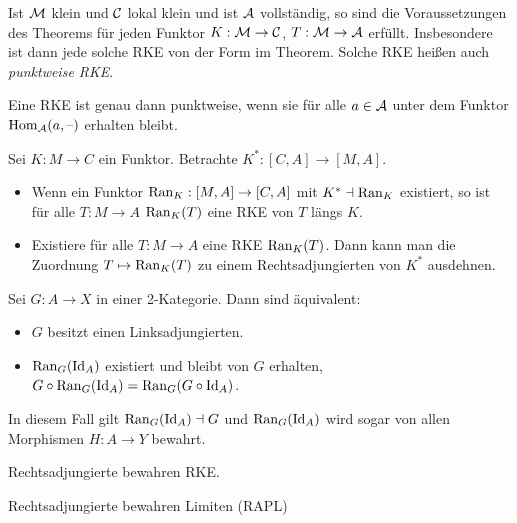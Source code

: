 \documentclass{cheat-sheet}
\begin{document}
\begin{bem}
  Ist $\mathcal{M}$ klein und $\mathcal{C}$ lokal klein und ist $\mathcal{A}$ vollständig, so sind die Voraussetzungen des Theorems für jeden Funktor $K : \mathcal{M} \to \mathcal{C}$, $T : \mathcal{M} \to \mathcal{A}$ erfüllt. Insbesondere ist dann jede solche RKE von der Form im Theorem. Solche RKE heißen auch \emph{punktweise RKE}.
\end{bem}

\begin{lem}
  Eine RKE ist genau dann punktweise, wenn sie für alle $a \in \mathcal{A}$ unter dem Funktor $\operatorname{Hom}_{\mathcal{A}}(a, \text{--})$ erhalten bleibt.
\end{lem}

\begin{thm}
  Sei $K : M \to C$ ein Funktor. Betrachte $K^* : [C, A] \to [M, A]$.
  \begin{itemize}
    \item Wenn ein Funktor $\operatorname{Ran}_K : [M,A] \to [C, A]$ mit $K^* \dashv \operatorname{Ran}_K$ existiert, so ist für alle $T : M \to A$ $\operatorname{Ran}_K(T)$ eine RKE von $T$ längs $K$.
    \item Existiere für alle $T : M \to A$ eine RKE $\operatorname{Ran}_K(T)$. Dann kann man die Zuordnung $T \mapsto \operatorname{Ran}_K(T)$ zu einem Rechtsadjungierten von $K^*$ ausdehnen.
  \end{itemize}
\end{thm}

\begin{thm}
  Sei $G : A \to X$ in einer 2-Kategorie. Dann sind äquivalent:
  \begin{itemize}
    \item $G$ besitzt einen Linksadjungierten.
    \item $\operatorname{Ran}_G(\operatorname{Id}_A)$ existiert und bleibt von $G$ erhalten, \dh{} $G \circ \operatorname{Ran}_G(\operatorname{Id}_A) = \operatorname{Ran}_G(G \circ \operatorname{Id}_A)$.
  \end{itemize}
  In diesem Fall gilt $\operatorname{Ran}_G(\operatorname{Id}_A) \dashv G$ und $\operatorname{Ran}_G(\operatorname{Id}_A)$ wird sogar von allen Morphismen $H : A \to Y$ bewahrt.
\end{thm}

\begin{thm}
  Rechtsadjungierte bewahren RKE.
\end{thm}

\begin{kor}
  Rechtsadjungierte bewahren Limiten (RAPL)
\end{kor}
\end{document}
